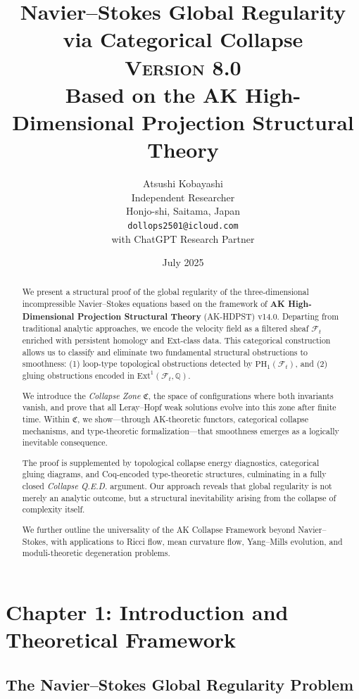 \documentclass[11pt]{article}
\title{Navier–Stokes Global Regularity via Categorical Collapse\\
\Large \textsc{Version 8.0}\\
\small Based on the AK High-Dimensional Projection Structural Theory}
\author{Atsushi Kobayashi\\
Independent Researcher\\
Honjo-shi, Saitama, Japan\\
\small \texttt{dollops2501@icloud.com}\\
\small with ChatGPT Research Partner}
\date{July 2025}
\begin{document}
\maketitle
\tableofcontents
\newpage



\begin{abstract}
We present a structural proof of the global regularity of the three-dimensional incompressible Navier--Stokes equations based on the framework of \textbf{AK High-Dimensional Projection Structural Theory} (AK-HDPST) v14.0. Departing from traditional analytic approaches, we encode the velocity field as a filtered sheaf $\mathcal{F}_t$ enriched with persistent homology and Ext-class data. This categorical construction allows us to classify and eliminate two fundamental structural obstructions to smoothness: (1) loop-type topological obstructions detected by $\mathrm{PH}_1(\mathcal{F}_t)$, and (2) gluing obstructions encoded in $\mathrm{Ext}^1(\mathcal{F}_t, \mathbb{Q})$.

We introduce the \emph{Collapse Zone} $\mathfrak{C}$, the space of configurations where both invariants vanish, and prove that all Leray--Hopf weak solutions evolve into this zone after finite time. Within $\mathfrak{C}$, we show---through AK-theoretic functors, categorical collapse mechanisms, and type-theoretic formalization---that smoothness emerges as a logically inevitable consequence.

The proof is supplemented by topological collapse energy diagnostics, categorical gluing diagrams, and Coq-encoded type-theoretic structures, culminating in a fully closed \emph{Collapse Q.E.D.} argument. Our approach reveals that global regularity is not merely an analytic outcome, but a structural inevitability arising from the collapse of complexity itself.

We further outline the universality of the AK Collapse Framework beyond Navier--Stokes, with applications to Ricci flow, mean curvature flow, Yang--Mills evolution, and moduli-theoretic degeneration problems.
\end{abstract}



\section{Chapter 1: Introduction and Theoretical Framework}
\label{sec:introduction}

\subsection{The Navier--Stokes Global Regularity Problem}
\end{document}
